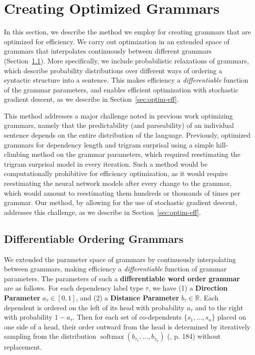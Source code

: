\documentclass[10pt,twoside,lineno]{article}
\newcommand{\key}[1]{\textbf{#1}}
\begin{document}
\section{Creating Optimized Grammars}

In this section, we describe the method we employ for creating grammars that are optimized for efficiency.
We carry out optimization in an extended space of grammars that interpolates continuously between different grammars (Section~\ref{sec:diff-gramm}).
More specifically, we include probabilistic relaxations of grammars, which describe probability distributions over different ways of ordering a syntactic structure into a sentence.
This makes efficiency a \emph{differentiable} function of the grammar parameters, and enables efficient optimization with stochastic gradient descent, as we describe in Section~\ref{sec:optim-eff}.

This method addresses a major challenge noted in previous work optimizing grammars, namely that the predictability (and parseability) of an individual sentence depends on the entire distribution of the language.
Previously, \citet{gildea2015human} optimized grammars for dependency length and trigram surprisal using a simple hill-climbing method on the grammar parameters, which required reestimating the trigram surprisal model in every iteration.
Such a method would be computationally prohibitive for efficiency optimization, as it would require reestimating the neural network models after every change to the grammar, which would amount to reestimating them hundreds or thousands of times per grammar.
Our method, by allowing for the use of stochastic gradient descent, addresses this challenge, as we describe in Section~\ref{sec:optim-eff}.


\subsection{Differentiable Ordering Grammars}\label{sec:diff-gramm}

We extended the parameter space of grammars by continuously interpolating between grammars, making efficiency a \emph{differentiable} function of grammar parameters.
The parameters of such a \key{differentiable word order grammar} are as follows. 
For each dependency label type $\tau$, we have (1) a \key{Direction Parameter} $a_\tau \in [0,1]$, and (2) a \key{Distance Parameter} $b_\tau \in \mathbb{R}$. 
Each dependent is ordered on the left of its head with probability $a_\tau$ and to the right with probability $1-a_\tau$. 
Then for each set of co-dependents $\{s_1, \dots , s_n\}$ placed on one side of a head, their order outward from the head is determined by iteratively sampling from the distribution $\operatorname{softmax}(b_{\tau_1}, \dots, b_{\tau_n})$ (\cite{goodfellow2016deep}, p. 184) without replacement. 
\end{document}
